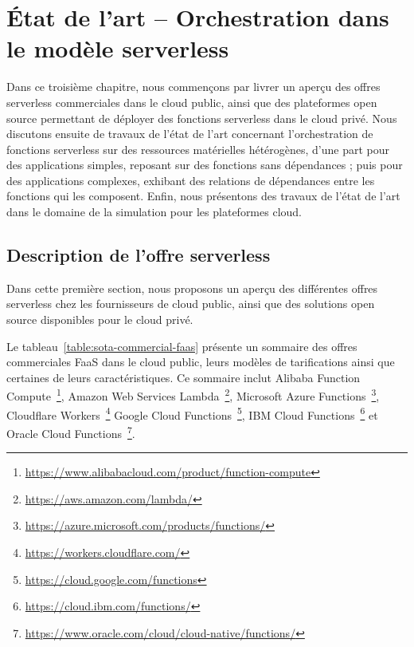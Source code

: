 \chapter{État de l'art -- Orchestration dans le modèle serverless}
\label{chapter:sota}

Dans ce troisième chapitre, nous commençons par livrer un aperçu des offres serverless commerciales dans le cloud public, ainsi que des plateformes open source permettant de déployer des fonctions serverless dans le cloud privé.
Nous discutons ensuite de travaux de l'état de l'art concernant l'orchestration de fonctions serverless sur des ressources matérielles hétérogènes, d'une part pour des applications simples, reposant sur des fonctions sans dépendances ; puis pour des applications complexes, exhibant des relations de dépendances entre les fonctions qui les composent. Enfin, nous présentons des travaux de l'état de l'art dans le domaine de la simulation pour les plateformes cloud.

\section{Description de l'offre serverless}
\label{section:sota-offerings}

Dans cette première section, nous proposons un aperçu des différentes offres serverless chez les fournisseurs de cloud public, ainsi que des solutions open source disponibles pour le cloud privé.

Le tableau~\ref{table:sota-commercial-faas} présente un sommaire des offres commerciales \gls{FaaS} dans le cloud public, leurs modèles de tarifications ainsi que certaines de leurs caractéristiques. Ce sommaire inclut Alibaba Function Compute~\footnote{\label{footnote:alibaba-function}\href{https://www.alibabacloud.com/product/function-compute}{https://www.alibabacloud.com/product/function-compute}}, Amazon Web Services Lambda~\footnote{\label{footnote:aws-lambda}\href{https://aws.amazon.com/lambda/}{https://aws.amazon.com/lambda/}}, Microsoft Azure Functions~\footnote{\label{footnote:azure-functions}\href{https://azure.microsoft.com/products/functions/}{https://azure.microsoft.com/products/functions/}}, Cloudflare Workers~\footnote{\label{footnote:cloudflare-workers}\href{https://workers.cloudflare.com/}{https://workers.cloudflare.com/}} Google Cloud Functions~\footnote{\label{footnote:google-functions}\href{https://cloud.google.com/functions}{https://cloud.google.com/functions}}, IBM Cloud Functions~\footnote{\label{footnote:ibm-functions}\href{https://cloud.ibm.com/functions/}{https://cloud.ibm.com/functions/}} et Oracle Cloud Functions~\footnote{\label{footnote:oracle-functions}\href{https://www.oracle.com/cloud/cloud-native/functions/}{https://www.oracle.com/cloud/cloud-native/functions/}}.

